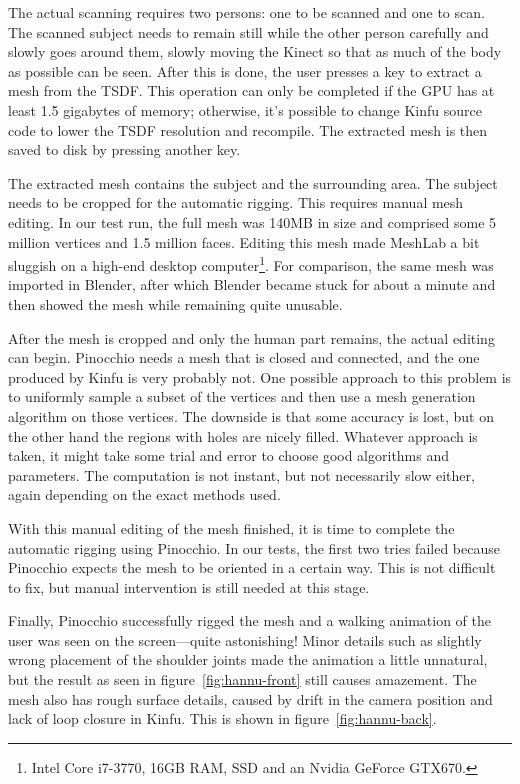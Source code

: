 The actual scanning requires two persons: one to be scanned and one to scan. The scanned subject needs to remain still while the other person carefully and slowly goes around them, slowly moving the Kinect so that as much of the body as possible can be seen. After this is done, the user presses a key to extract a mesh from the TSDF. This operation can only be completed if the GPU has at least 1.5 gigabytes of memory; otherwise, it's possible to change Kinfu source code to lower the TSDF resolution and recompile. The extracted mesh is then saved to disk by pressing another key.

The extracted mesh contains the subject and the surrounding area. The subject needs to be cropped for the automatic rigging. This requires manual mesh editing. In our test run, the full mesh was 140MB in size and comprised some 5 million vertices and 1.5 million faces. Editing this mesh made MeshLab a bit sluggish on a high-end desktop computer\footnote{Intel Core i7-3770, 16GB RAM, SSD and an Nvidia GeForce GTX670.}. For comparison, the same mesh was imported in Blender, after which Blender became stuck for about a minute and then showed the mesh while remaining quite unusable.

After the mesh is cropped and only the human part remains, the actual editing can begin. Pinocchio needs a mesh that is closed and connected, and the one produced by Kinfu is very probably not. One possible approach to this problem is to uniformly sample a subset of the vertices and then use a mesh generation algorithm on those vertices. The downside is that some accuracy is lost, but on the other hand the regions with holes are nicely filled. Whatever approach is taken, it might take some trial and error to choose good algorithms and parameters. The computation is not instant, but not necessarily slow either, again depending on the exact methods used.

With this manual editing of the mesh finished, it is time to complete the automatic rigging using Pinocchio. In our tests, the first two tries failed because Pinocchio expects the mesh to be oriented in a certain way. This is not difficult to fix, but manual intervention is still needed at this stage.

Finally, Pinocchio successfully rigged the mesh and a walking animation of the user was seen on the screen---quite astonishing! Minor details such as slightly wrong placement of the shoulder joints made the animation a little unnatural, but the result as seen in figure~\ref{fig:hannu-front} still causes amazement. The mesh also has rough surface details, caused by drift in the camera position and lack of loop closure in Kinfu. This is shown in figure~\ref{fig:hannu-back}.

